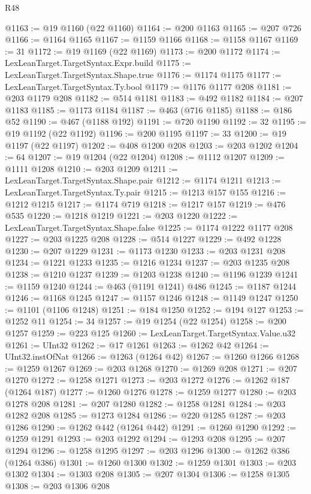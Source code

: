 \begin{lexlean}{R48}
\begin{coremodule}
@1163 := @19 @1160 (@22 @1160)
@1164 := @200 @1163
@1165 := @207 @726
@1166 := @1164 @1165
@1167 := @1159 @1166
@1168 := @1158 @1167
@1169 := 31
@1172 := @19 @1169 (@22 @1169)
@1173 := @200 @1172
@1174 := LexLeanTarget.TargetSyntax.Expr.build
@1175 := LexLeanTarget.TargetSyntax.Shape.true
@1176 := @1174 @1175
@1177 := LexLeanTarget.TargetSyntax.Ty.bool
@1179 := @1176 @1177 @208
@1181 := @203 @1179 @208
@1182 := @514 @1181
@1183 := @492 @1182
@1184 := @207 @1183
@1185 := @1173 @1184
@1187 := @463 (@716 @1185)
@1188 := @186 @52
@1190 := @467 (@1188 @192)
@1191 := @720 @1190
@1192 := 32
@1195 := @19 @1192 (@22 @1192)
@1196 := @200 @1195
@1197 := 33
@1200 := @19 @1197 (@22 @1197)
@1202 := @408 @1200 @208
@1203 := @203 @1202
@1204 := 64
@1207 := @19 @1204 (@22 @1204)
@1208 := @1112 @1207
@1209 := @1111 @1208
@1210 := @203 @1209
@1211 := LexLeanTarget.TargetSyntax.Shape.pair
@1212 := @1174 @1211
@1213 := LexLeanTarget.TargetSyntax.Ty.pair
@1215 := @1213 @157 @155
@1216 := @1212 @1215
@1217 := @1174 @719
@1218 := @1217 @157
@1219 := @476 @535
@1220 := @1218 @1219
@1221 := @203 @1220
@1222 := LexLeanTarget.TargetSyntax.Shape.false
@1225 := @1174 @1222 @1177 @208
@1227 := @203 @1225 @208
@1228 := @514 @1227
@1229 := @492 @1228
@1230 := @207 @1229
@1231 := @1173 @1230
@1233 := @203 @1231 @208
@1234 := @1221 @1233
@1235 := @1216 @1234
@1237 := @203 @1235 @208
@1238 := @1210 @1237
@1239 := @1203 @1238
@1240 := @1196 @1239
@1241 := @1159 @1240
@1244 := @463 (@1191 @1241) @486
@1245 := @1187 @1244
@1246 := @1168 @1245
@1247 := @1157 @1246
@1248 := @1149 @1247
@1250 := @1101 (@1106 @1248)
@1251 := @184 @1250
@1252 := @194 @127
@1253 := @1252 @11
@1254 := 34
@1257 := @19 @1254 (@22 @1254)
@1258 := @200 @1257
@1259 := @223 @125
@1260 := LexLeanTarget.TargetSyntax.Value.u32
@1261 := UInt32
@1262 := @17 @1261
@1263 := @1262 @42
@1264 := UInt32.instOfNat
@1266 := @1263 (@1264 @42)
@1267 := @1260 @1266
@1268 := @1259 @1267
@1269 := @203 @1268
@1270 := @1269 @208
@1271 := @207 @1270
@1272 := @1258 @1271
@1273 := @203 @1272
@1276 := @1262 @187 (@1264 @187)
@1277 := @1260 @1276
@1278 := @1259 @1277
@1280 := @203 @1278 @208
@1281 := @207 @1280
@1282 := @1258 @1281
@1284 := @203 @1282 @208
@1285 := @1273 @1284
@1286 := @220 @1285
@1287 := @203 @1286
@1290 := @1262 @442 (@1264 @442)
@1291 := @1260 @1290
@1292 := @1259 @1291
@1293 := @203 @1292
@1294 := @1293 @208
@1295 := @207 @1294
@1296 := @1258 @1295
@1297 := @203 @1296
@1300 := @1262 @386 (@1264 @386)
@1301 := @1260 @1300
@1302 := @1259 @1301
@1303 := @203 @1302
@1304 := @1303 @208
@1305 := @207 @1304
@1306 := @1258 @1305
@1308 := @203 @1306 @208

\end{coremodule}
\end{lexlean}
